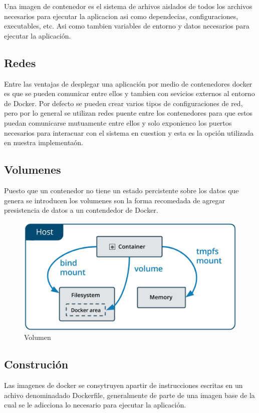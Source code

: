 Una imagen de contenedor es el sistema de arhivos aislados de todos los archivos necesarios para ejecutar la aplicacion asi como dependecias, configuraciones, executables, etc. Asi como tambien variables de entorno y datos necesarios para ejecutar la aplicación. \cite{Docker}  

\subsection{Redes}

Entre las ventajas de desplegar una aplicación por medio de contenedores docker es que se pueden comunicar entre ellos y tambien con sevicios externos al entorno de Docker. Por defecto se pueden crear varios tipos de configuraciones de red, pero por lo general se utilizan redes puente entre los contenedores para que estos puedan comunicarse mutuamente entre ellos y solo exponienco los puertos necesarios para interacuar con el sistema en cuestion y esta es la opción utilizada en nuestra implementaón. \cite{Docker}  

\subsection{Volumenes}
Puesto que un contenedor no tiene un estado percistente sobre los datos que genera se introducen los volumenes son la forma recomedada de agregar presistencia de datos a un contendedor de Docker. 
\cite{Docker} 

\begin{figure}[ht]
    \centering
    \includegraphics[width=\textwidth]{imagenes/cap4/docker-volume.png}
    \caption{Volumen}
    \label{fig:volume_diagram}
\end{figure}

\subsection{Construción}
Las imagenes de docker se consytruyen apartir de instrucciones escritas en un achivo denominadado Dockerfile, 
generalmente de parte de una imagen base de la cual se le adicciona lo necesario para ejecutar la aplicación.
\cite{Docker}


